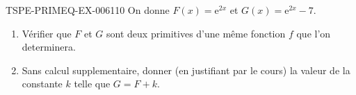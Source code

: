 \begin{exercice}{TSPE-PRIMEQ-EX-006}{1}{10}
On donne $F(x) = \mathrm{e}^{2x}$ et $G(x) = \mathrm{e}^{2x} - 7$.
\begin{enumerate}
  \item Vérifier que $F$ et $G$ sont deux primitives d'une même fonction $f$ que l'on determinera.
  \item Sans calcul supplementaire, donner (en justifiant par le cours) la valeur de la constante $k$ telle que $G = F + k$.
\end{enumerate}
\end{exercice}
